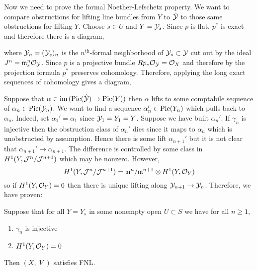 \documentclass[12pt]{article}
\begin{document}
Now we need to prove the formal Noether-Lefschetz property. We want to compare obstructions for lifting line bundles from $Y$ to $\hat{\mathcal{Y}}$ to those same obstructions for lifting $Y$.
Choose $s \in U$ and $Y = \mathcal{Y}_s$. Since $p$ is flat, $p^*$ is exact and therefore there is a diagram,
\begin{center}
\end{center}
where $\mathcal{Y}_{n} = (\mathcal{Y}_s)_n$ is the $n^{\text{th}}$-formal neighborhood of $\mathcal{Y}_s \subset \mathcal{Y}$ cut out by the ideal $J^n = \mathfrak{m}_s^n \mathcal{O}_{\mathcal{Y}}$. Since $p$ is a projective bundle $R p_* \mathcal{O}_{\mathcal{Y}} = \mathcal{O}_{X}$ and therefore by the projection formula $p^*$ preserves cohomology. Therefore, applying the long exact sequences of cohomology gives a diagram,
\begin{center}
\end{center}
Suppose that $\alpha \in \operatorname{\mathrm{im}}{(\mathrm{Pic}(\hat{\mathcal{Y}}) \to \mathrm{Pic}(Y))}$ then $\alpha$ lifts to some comptabile sequence of $\alpha_n \in \mathrm{Pic}(\mathcal{Y}_{n})$. We want to find a sequence $\alpha_n' \in \mathrm{Pic}(Y_n)$ which pulls back to $\alpha_n$. Indeed, set $\alpha_1' = \alpha_1$ since $\mathcal{Y}_1 = Y_1 = Y$. Suppose we have built $\alpha_n'$. If $\gamma_n$ is injective then the obstruction class of $\alpha_n'$ dies since it maps to $\alpha_n$ which is unobstructed by assumption. Hence there is some lift $\alpha_{n+1}'$ but it is not clear that $\alpha_{n+1}' \mapsto \alpha_{n+1}$. The difference is controlled by some class in $H^1(Y, \mathcal{J}^n / \mathcal{J}^{n+1})$ which may be nonzero. However,
\[ H^1(Y, \mathcal{J}^n / \mathcal{J}^{n+1}) = \mathfrak{m}^n / \mathfrak{m}^{n+1} \otimes H^1(Y, \mathcal{O}_{Y}) \]
so if $H^1(Y, \mathcal{O}_{Y}) = 0$ then there is unique lifting along $\mathcal{Y}_{n+1} \to \mathcal{Y}_n$.
Therefore, we have proven:

\begin{lemma} \label{lemma:FNL_holds}
Suppose that for all $Y = Y_s$ in some nonempty open $U \subset S$ we have for all $n \ge 1$,
\begin{enumerate}
\item $\gamma_n$ is injective
\item $H^1(Y, \mathcal{O}_{Y}) = 0$
\end{enumerate} 
Then $(X, |V|)$ satisfies FNL.
\end{lemma}
\end{document}

